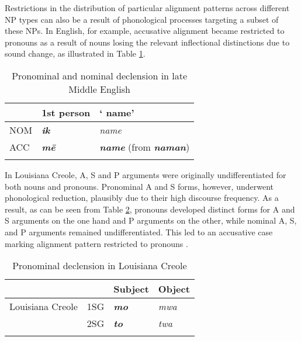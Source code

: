 \documentclass[output=paper]{langsci/langscibook}
\begin{document}
\z

Restrictions in the distribution of particular
alignment patterns across different NP types can also be a result of
phonological processes targeting a subset of these
NPs. 
In English, for example, accusative alignment
  became restricted to pronouns as a result of nouns losing the
  relevant inflectional distinctions due to sound change, as illustrated in Table
  \ref{blake}. 



\begin{table}
  
    \begin{tabular}{lll}
    \lsptoprule
 &1st person&` name'\\
 \midrule
      NOM&\textbf{\textit{ik}} &{\em name}\\
      ACC &\textbf{\textit{mē}} &\textbf{\textit{name}} (from \textbf{\textit{naman}})\\
      \lspbottomrule
\end{tabular}
  
\caption{Pronominal and nominal declension in late Middle English \protect{} \label{blake}}
\end{table}

In Louisiana Creole, A, S and P arguments were originally
undifferentiated for both nouns and pronouns. Pronominal A and S forms,
however, underwent phonological reduction, plausibly due to their high discourse frequency. As a result, as can be seen from Table \ref{apics}, pronouns developed
 distinct forms for A and S
    arguments on the one hand and P arguments on the other, while nominal A, S, and P arguments
    remained undifferentiated. This led to an accusative case marking
    alignment pattern restricted to pronouns \citep{HaspelmathAPiCS}.
   

\begin{table}
  
\begin{tabular}{llll}
\lsptoprule
 & &Subject &Object\\
 \midrule
 Louisiana Creole &1SG &\textbf{\textit{mo}} &{\em mwa}\\
 &2SG &\textbf{\textit{to}} &{\em twa}\\
 \lspbottomrule
\end{tabular}
  
  \caption{Pronominal declension in Louisiana Creole \citep{HaspelmathAPiCS}}\label{apics}
  \end{table}
\end{document}
